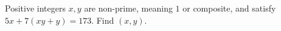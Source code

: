 Positive integers $x,y$ are non-prime, meaning $1$ or composite, and satisfy $5x+7(xy+y)=173$. Find $(x,y)$.
